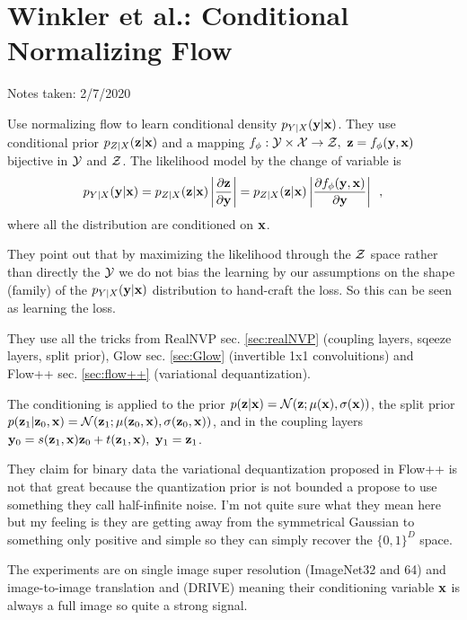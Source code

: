 \clearpage 

\section{Winkler et al.: Conditional Normalizing Flow}\label{sec:CNF}

\begin{notebox}

\hfill Notes taken: 2/7/2020 
\end{notebox}

Use normalizing flow to learn conditional density $p_{Y|X}(\mathbf{y} | \mathbf{x})$. They use conditional prior $p_{Z|X}(\mathbf{z} | \mathbf{x})$ and a mapping $f_\phi : \mY \times \mX \to \mZ, \ \bz = f_\phi(\by, \bx)$ bijective in $\mathcal{Y}$ and $\mathcal{Z}$.
The likelihood model by the change of variable is
\begin{equation}
p_{Y|X}(\mathbf{y} | \mathbf{x}) = p_{Z|X}(\mathbf{z} | \mathbf{x}) \left\lvert \frac{\partial \mathbf{z}}{\partial \mathbf{y}} \right\rvert
=
p_{Z|X}(\mathbf{z} | \mathbf{x}) \left\lvert \frac{\partial f_\phi(\mathbf{y}, \mathbf{x})}{\partial \mathbf{y}} \right\rvert \enspace ,
\end{equation}
where all the distribution are conditioned on $\mathbf{x}$.

They point out that by maximizing the likelihood through the $\mathcal{Z}$ space rather than directly the $\mathcal{Y}$ we do not bias the learning by our assumptions on the shape (family) of the $p_{Y|X}(\mathbf{y} | \mathbf{x})$ distribution to hand-craft the loss. So this can be seen as learning the loss.

They use all the tricks from RealNVP sec. \ref{sec:realNVP} (coupling layers, sqeeze layers, split prior), Glow sec. \ref{sec:Glow} (invertible 1x1 convoluitions) and Flow++ sec. \ref{sec:flow++} (variational dequantization).

The conditioning is applied to the prior $p(\mathbf{z} | \mathbf{x}) = \mathcal{N}(\mathbf{z}; \mu(\mathbf{x}), \sigma(\mathbf{x}))$, the split prior $p(\mathbf{z}_1 | \mathbf{z}_0, \mathbf{x}) = \mathcal{N}(\mathbf{z}_1; \mu(\mathbf{z}_0, \mathbf{x}), \sigma(\mathbf{z}_0, \mathbf{x}))$, and in the coupling layers $\by_0 = s(\bz_1, \bx) \bz_0 + t(\bz_1, \bx), \ \by_1 = \bz_1$.

They claim for binary data the variational dequantization proposed in Flow++ is not that great because the quantization prior is not bounded a propose to use something they call half-infinite noise. I'm not quite sure what they mean here but my feeling is they are getting away from the symmetrical Gaussian to something only positive and simple so they can simply recover the $\{0, 1\}^D$ space.

The experiments are on single image super resolution (ImageNet32 and 64) and image-to-image translation and (DRIVE) meaning their conditioning variable $\mathbf{x}$ is always a full image so quite a strong signal. 

